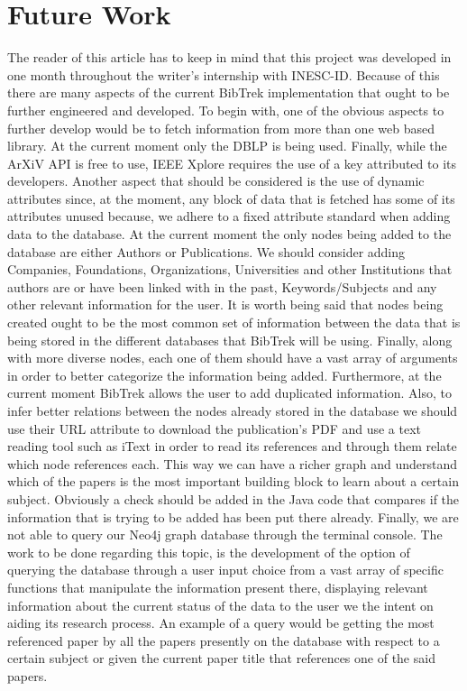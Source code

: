 \documentclass[twocolumn]{article}
\begin{document}
\section{Future Work}
The reader of this article has to keep in mind that this project was developed in one month throughout the writer's internship with INESC-ID. Because of this there are many aspects of the current BibTrek implementation that ought to be further engineered and developed. To begin with, one of the obvious aspects to further develop would be to fetch information from more than one web based library. At the current moment only the DBLP is being used. Finally, while the ArXiV API is free to use, IEEE Xplore requires the use of a key attributed to its developers. Another aspect that should be considered is the use of dynamic attributes since, at the moment, any block of data that is fetched has some of its attributes unused because, we adhere to a fixed attribute standard when adding data to the database. At the current moment the only nodes being added to the database are either Authors or Publications. We should consider adding Companies, Foundations, Organizations, Universities and other Institutions that authors are or have been linked with in the past, Keywords/Subjects and any other relevant information for the user. It is worth being said that nodes being created ought to be the most common set of information between the data that is being stored in the different databases that BibTrek will be using. Finally, along with more diverse nodes, each one of them should have a vast array of arguments in order to better categorize the information being added. Furthermore, at the current moment BibTrek allows the user to add duplicated information. Also, to infer better relations between the nodes already stored in the database we should use their URL attribute to download the publication's PDF and use a text reading tool such as iText in order to read its references and through them relate which node references each. This way we can have a richer graph and understand which of the papers is the most important building block to learn about a certain subject. Obviously a check should be added in the Java code that compares if the information that is trying to be added has been put there already. Finally, we are not able to query our Neo4j graph database through the terminal console. The work to be done regarding this topic, is the development of the option of querying the database through a user input choice from a vast array of specific functions that manipulate the information present there, displaying relevant information about the current status of the data to the user we the intent on aiding its research process. An example of a query would be getting the most referenced paper by all the papers presently on the database with respect to a certain subject or given the current paper title that references one of the said papers.
\end{document}
